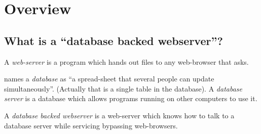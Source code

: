 
\chapter{Overview}



\section{What is a ``database backed webserver''?}

  A \textit{web-server} is a program which hands out files to any web-browser
that asks.

\cite{phillipandalexsguidetowebpublishing} names a \textit{database}
as ``a spread-sheet that several people can update simultaneously''.
(Actually that is a single table in the database).  A \textit{database
  server} is a database which allows programs running on other
computers to use it.

A \textit{database backed webserver} is a web-server which knows how
to talk to a database server while servicing bypassing web-browsers.







